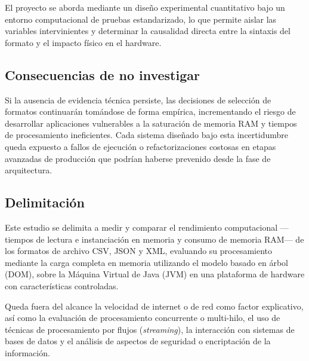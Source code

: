 El proyecto se aborda mediante un diseño experimental cuantitativo bajo un entorno computacional de pruebas estandarizado, lo que permite aislar las variables intervinientes y determinar la causalidad directa entre la sintaxis del formato y el impacto físico en el hardware.


\subsection{Consecuencias de no investigar}

Si la ausencia de evidencia técnica persiste, las decisiones de selección de formatos continuarán tomándose de forma empírica, incrementando el riesgo de desarrollar aplicaciones vulnerables a la saturación de memoria RAM y tiempos de procesamiento ineficientes. Cada sistema diseñado bajo esta incertidumbre queda expuesto a fallos de ejecución o refactorizaciones costosas en etapas avanzadas de producción que podrían haberse prevenido desde la fase de arquitectura.


\subsection{Delimitación}

Este estudio se delimita a medir y comparar el rendimiento computacional —tiempos de lectura e instanciación en memoria y consumo de memoria RAM— de los formatos de archivo CSV, JSON y XML, evaluando su procesamiento mediante la carga completa en memoria utilizando el modelo basado en árbol (DOM), sobre la Máquina Virtual de Java (JVM) en una plataforma de hardware con características controladas.

Queda fuera del alcance la velocidad de internet o de red como factor explicativo, así como la evaluación de procesamiento concurrente o multi-hilo, el uso de técnicas de procesamiento por flujos (\textit{streaming}), la interacción con sistemas de bases de datos y el análisis de aspectos de seguridad o encriptación de la información.